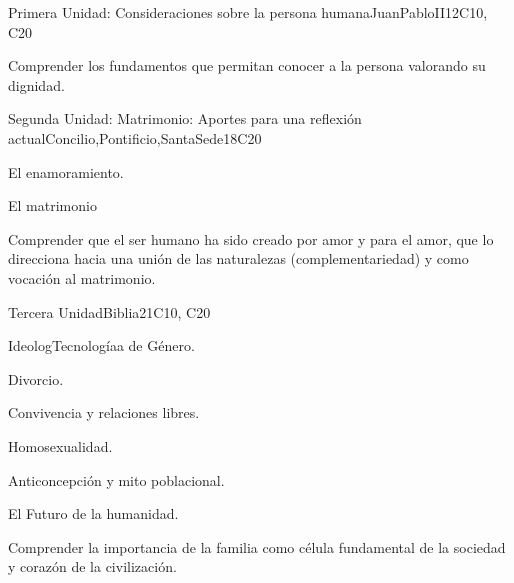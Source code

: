 \begin{syllabus}
\begin{unit}{}{Primera Unidad: Consideraciones sobre la persona humana}{JuanPabloII}{12}{C10, C20}
\begin{learningoutcomes}
	\item Comprender los fundamentos que permitan conocer a la persona valorando su dignidad.
\end{learningoutcomes}
\end{unit}

\begin{unit}{}{Segunda Unidad: Matrimonio: Aportes para una reflexión actual}{Concilio,Pontificio,SantaSede}{18}{C20}
\begin{topics}
	\item El enamoramiento.
    \item El matrimonio	
\end{topics}
\begin{learningoutcomes}
	\item Comprender que el ser humano ha sido creado por amor y para el amor, que lo direcciona hacia una unión de las naturalezas (complementariedad) y como vocación al matrimonio.
\end{learningoutcomes}
\end{unit}

\begin{unit}{}{Tercera Unidad}{Biblia}{21}{C10, C20}
\begin{topics}
	\item IdeologTecnologíaa de Género.
	\item Divorcio.
	\item Convivencia y relaciones libres.
	\item Homosexualidad.
	\item Anticoncepción y mito poblacional.
	\item El Futuro de la humanidad.
\end{topics}
\begin{learningoutcomes}
	\item Comprender la importancia de la familia como célula fundamental de la sociedad y corazón de la civilización.
\end{learningoutcomes}
\end{unit}


\end{syllabus}
